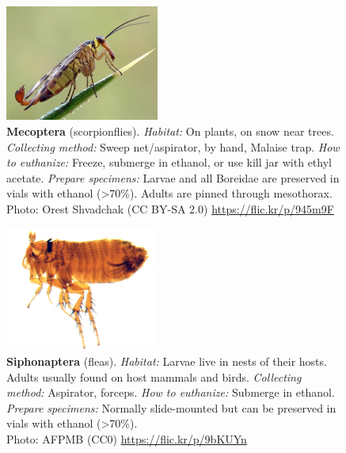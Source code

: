 \documentclass[letterpaper, 11pt]{article}
\begin{document}
\begin{figure}
  \caption*{\textbf{Mecoptera} (scorpionflies). \textit{Habitat:} On plants, on snow near trees. \textit{Collecting method:} Sweep net/aspirator, by hand, Malaise trap. \textit{How to euthanize:} Freeze, submerge in ethanol, or use kill jar with ethyl acetate. \textit{Prepare specimens:} Larvae and all Boreidae are preserved in vials with ethanol (\textgreater70\%). Adults are pinned through mesothorax.\\ Photo: Orest Shvadchak (CC BY-SA 2.0) \url{https://flic.kr/p/945m9F}}
  \includegraphics[width=0.45\textwidth]{Mecoptera}
\end{figure}

\begin{figure}
  \caption*{\textbf{Siphonaptera} (fleas). \textit{Habitat:} Larvae live in nests of their hosts. Adults usually found on host mammals and birds. \textit{Collecting method:} Aspirator, forceps. \textit{How to euthanize:} Submerge in ethanol. \textit{Prepare specimens:} Normally slide-mounted but can be preserved in vials with ethanol (\textgreater70\%).\\ Photo: AFPMB (CC0) \url{https://flic.kr/p/9bKUYn}}
  \includegraphics[width=0.45\textwidth]{Siphonaptera}
\end{figure}

\clearpage
\end{document}
